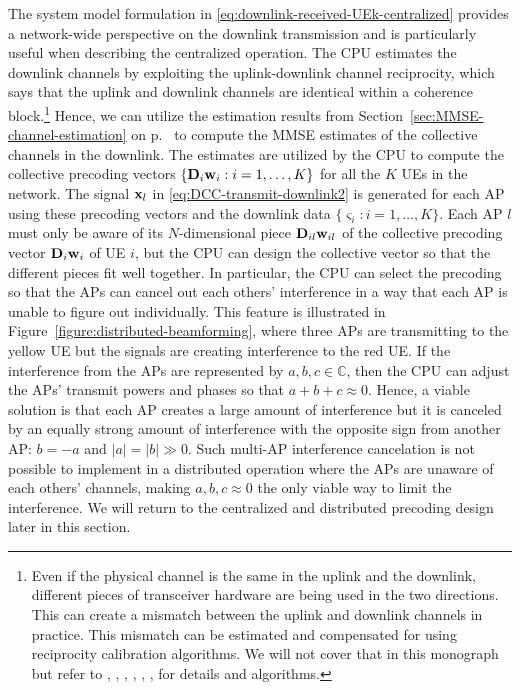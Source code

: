 The system model formulation in \eqref{eq:downlink-received-UEk-centralized} provides a network-wide perspective on the downlink transmission
and is particularly useful when describing the centralized operation. 
The CPU estimates the downlink channels by exploiting the uplink-downlink channel reciprocity, which says that the uplink and downlink channels are identical within a coherence block.\footnote{Even if the physical channel is the same in the uplink and the downlink, different pieces of transceiver hardware are being used in the two directions. This can create a mismatch between the uplink and downlink channels in practice. This mismatch can be estimated and compensated for using reciprocity calibration algorithms. We will not cover that in this monograph but refer to \cite{Guillaud2005a}, \cite{Nishimori2001a}, \cite{Rogalin2014a}, \cite{Shepard2012a}, \cite{Vieira2017a}, \cite{Vieira2014b}, \cite{Zetterberg2011a} for details and algorithms.}
Hence, we can utilize the estimation results from Section~\ref{sec:MMSE-channel-estimation} on p.~\pageref{sec:MMSE-channel-estimation} to compute the MMSE estimates of the collective channels in the downlink.
The estimates are utilized by the CPU  to compute the collective precoding vectors $\{ \mathbf{D}_i \mathbf{w}_i:i=1,\ldots,K\}$ for all the $K$ UEs in the network. 
The signal $\mathbf{x}_l$ in \eqref{eq:DCC-transmit-downlink2} is generated for each AP using these precoding vectors and the downlink data $\{\varsigma_i:i=1,\ldots,K\}$. Each AP $l$ must only be aware of its $N$-dimensional piece $\mathbf{D}_{il}  \mathbf{w}_{il}$ of the collective precoding vector $\mathbf{D}_{i}  \mathbf{w}_{i}$ of UE $i$, but the CPU can design the collective vector so that the different pieces fit well together. In particular, the CPU can select the precoding so that the APs can cancel out each others' interference in a way that each AP is unable to figure out individually. This feature is illustrated in Figure~\ref{figure:distributed-beamforming}, where three APs are transmitting to the yellow UE but the signals are creating interference to the red UE. If the interference from the APs are represented by $a,b,c \in \mathbb{C}$, then the CPU can adjust the APs' transmit powers and phases so that $a+b+c \approx 0$. Hence, a viable solution is that each AP creates a large amount of interference but it is canceled by an equally strong amount of interference with the opposite sign from another AP: $b = -a$ and $|a|=|b| \gg 0$.
Such multi-AP interference cancelation is not possible to implement in a distributed operation where the APs are unaware of each others' channels, making $a,b,c \approx 0$ the only viable way to limit the interference.
We will return to the centralized and distributed precoding design later in this section. 

